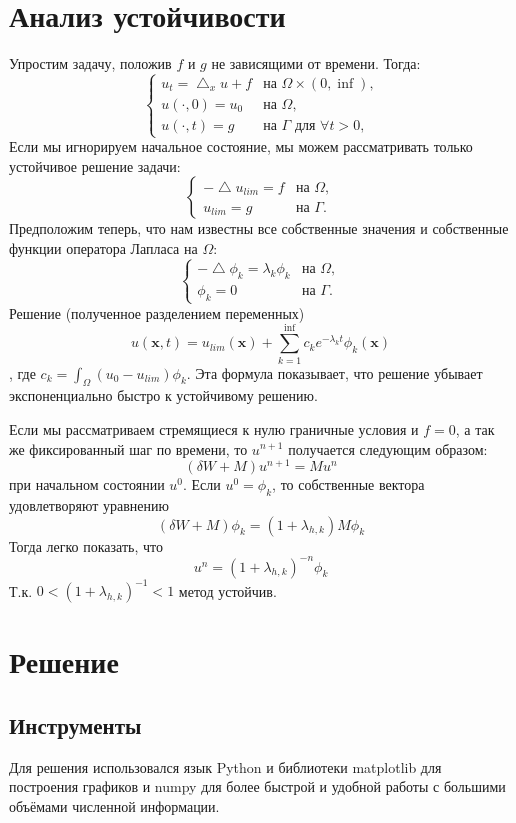 \documentclass[paper=a4, fontsize=13pt]{scrartcl} %
\numberwithin{equation}{section} %
\numberwithin{figure}{section} %
\numberwithin{table}{section} %
\begin{document}
\section{Анализ устойчивости}
Упростим задачу, положив $f$ и $g$ не зависящими от времени. Тогда:
    \[
        \begin{cases}
            u_t = \bigtriangleup_x u + f& \text{на $\Omega \times (0, \inf)$,} \\
            u(\cdot, 0) = u_0& \text{на $\Omega$}, \\
            u(\cdot, t) = g& \text{на $\Gamma$ для $\forall t > 0$,}
        \end{cases}
    \]
Если мы игнорируем начальное состояние, мы можем рассматривать только устойчивое решение задачи:
    \[
        \begin{cases}
            -\bigtriangleup u_{lim} = f& \text{на $\Omega$}, \\
            u_{lim} = g& \text{на $\Gamma$.}
        \end{cases}
    \]
Предположим теперь, что нам известны все собственные значения и собственные функции оператора Лапласа на $\Omega$:
    \[
        \begin{cases}
            -\bigtriangleup \phi_k = \lambda_k \phi_k& \text{на $\Omega$}, \\
            \phi_k = 0& \text{на $\Gamma$.}
        \end{cases}
    \]
Решение (полученное разделением переменных) $$u(\bm{x}, t) = u_{lim}(\bm{x}) + \sum_{k=1}^{\inf} c_k e^{-\lambda_k t} \phi_k(\bm{x})$$, где $c_k = \int _\Omega (u_0 - u_{lim}) \phi_k$. Эта формула показывает, что решение убывает экспоненциально быстро к устойчивому решению.

Если мы рассматриваем стремящиеся к нулю граничные условия и $f = 0$, а так же фиксированный шаг по времени, то $u^{n+1}$ получается следующим образом: $$(\delta W + M) u^{n+1} = M u^n$$ при начальном состоянии $u^0$. Если $u^0 = \phi_k$, то собственные вектора удовлетворяют уравнению $$(\delta W + M) \phi_k = (1 + \lambda_{h, k}) M \phi_k$$ Тогда легко показать, что $$u^n = (1 + \lambda_{h, k})^{-n} \phi_k$$ Т.к. $0 < (1 + \lambda_{h, k})^{-1} < 1$ метод устойчив.
\newpage
\section{Решение}
\subsection{Инструменты}
Для решения использовался язык Python и библиотеки matplotlib для построения графиков и numpy для более быстрой и удобной работы с большими объёмами численной информации.
\end{document}
